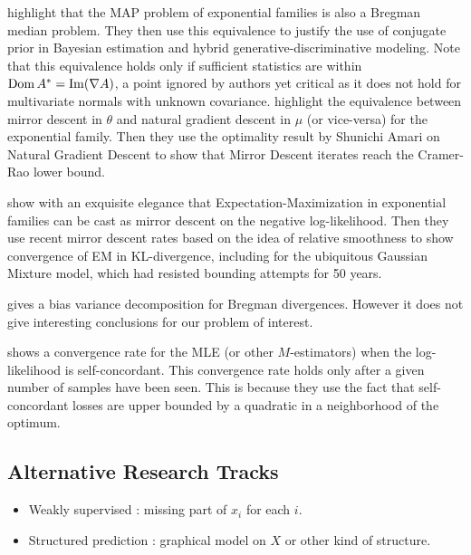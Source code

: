 \documentclass{article}
\newcommand{\logpart}{A}
\newcommand{\conj}{\logpart^*}
\newcommand{\natp}{\theta}
\newcommand{\meanp}{\mu}
\begin{document}
\citet{agarwal2010geometric} highlight that the MAP problem of exponential families is also a Bregman median problem. They then use this equivalence to justify the use of conjugate prior in Bayesian estimation and hybrid generative-discriminative modeling.
Note that this equivalence holds only if sufficient statistics are within $\dom \conj  = \mathrm{Im} (\nabla\logpart)$, a point ignored by authors yet critical as it does not hold for multivariate normals with unknown covariance. 
\citet{raskutti2015information} highlight the equivalence between mirror descent in $\natp$ and natural gradient descent in $\meanp$ (or vice-versa) for the exponential family. Then they use the optimality result by Shunichi Amari on Natural Gradient Descent to show that Mirror Descent iterates reach the Cramer-Rao lower bound.

\citet{kunstner2020homeomorphic} show with an exquisite elegance that Expectation-Maximization in exponential families can be cast as mirror descent on the negative log-likelihood. Then they use recent mirror descent rates based on the idea of relative smoothness \citep{birnbaum2011distributed, bauschke2017descent, lu2018relatively} to show convergence of EM in KL-divergence, including for the ubiquitous Gaussian Mixture model, which had resisted bounding attempts for 50 years.

\citet{pfau2013generalized} gives a bias variance decomposition for Bregman divergences. However it does not give interesting conclusions for our problem of interest.

\citet{ostrovskii2021finite}  shows a convergence rate for the MLE (or other $M$-estimators)   when  the log-likelihood is self-concordant. This convergence rate holds only after a given number of samples have been seen. This is because they use the fact that self-concordant losses are upper bounded by a quadratic in a neighborhood of the optimum. 

\subsection{Alternative Research Tracks}
\begin{itemize}
	\item Weakly supervised : missing part of $x_i$ for each $i$.
	\item Structured prediction : graphical model on $X$ or other kind of structure.
\end{itemize}
\end{document}
